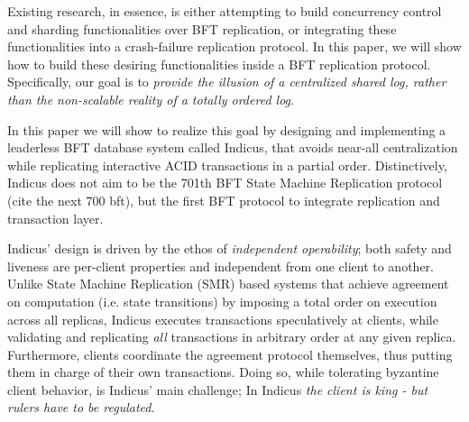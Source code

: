 Existing research, in essence, is either attempting to build concurrency control and sharding functionalities over BFT replication, or integrating these functionalities into a crash-failure replication protocol. In this paper, we will show how to build these desiring functionalities inside a BFT replication protocol. Specifically, our goal is to \textit{provide the illusion of a centralized shared log, rather than the non-scalable reality of a totally ordered log}.\\

\iffalse
\fs{rambling too long}
\fs{CUT FROM HERE}

While copious efforts exist to design decentralized systems that exploit transaction semantics for the crash failure model, few, if any attempts have been made for the Byzantine Fault Model. This naturally raises the question, why so? One explanation is that in Byzantine Systems, some centralization is in fact highly desirable as it simplifies the problem by identifying a single point of accountability. A natural way to improve both scalability and fairness is to avoid this bottleneck, at the cost of paving the path for a wider set of undesirable phenomena. The challenge of a leaderless byzantine system is simple yet daunting: It empowers both malicious users and system components to collude and misbehave in potentially unaccountable ways.
In this paper we will show to overcome this challenge by designing and implementing the leaderless BFT system Indicus that avoids near-all centralization while replicating interactive ACID transactions in a partial order. 
\fs{client driven protocol could be seen as nightmare for byz system. What is our design agenda to control this? -> Byz can only influence itself. Honest users can keep using the system }\\
\fs{CUT TILL HERE}
\fi

In this paper we will show to realize this goal by designing and implementing a leaderless BFT database system called Indicus, that avoids near-all centralization while replicating interactive ACID transactions in a partial order. Distinctively, Indicus does not aim to be the 701th BFT State Machine Replication protocol (cite the next 700 bft), but the first BFT protocol to integrate replication and transaction layer.

Indicus' design is driven by the ethos of \textit{independent operability}; both safety  and liveness  are per-client properties and independent from one client to another.
 Unlike State Machine Replication (SMR) based systems that achieve agreement on computation (i.e. state transitions) by imposing a total order on execution across all replicas, Indicus executes transactions speculatively at clients, while validating and replicating \textit{all} transactions in arbitrary order at any given replica. Furthermore, clients coordinate the agreement protocol themselves, thus putting them in charge of their own transactions. Doing so, while tolerating byzantine client behavior, is Indicus' main challenge; In Indicus \textit{the client is king - but rulers have to be regulated}.

